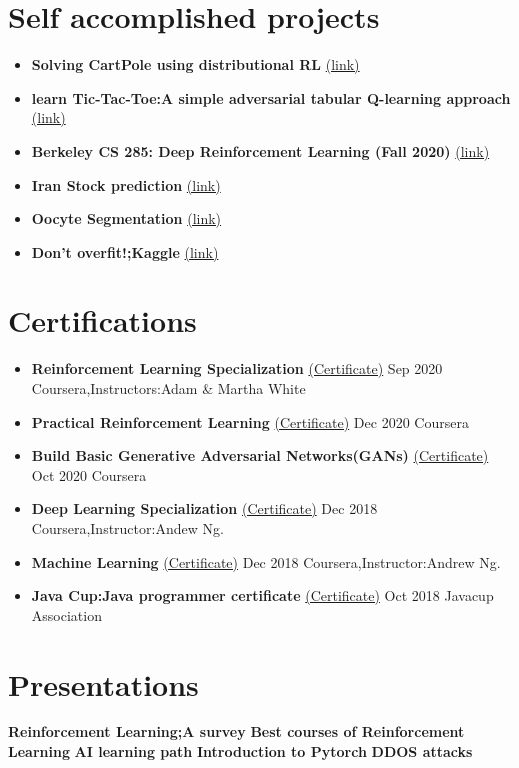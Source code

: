 \documentclass[paper=a4,fontsize=11pt]{scrartcl} %
\newcommand{\dline}{\newline \newline}
\newcommand{\NewPart}[1]{\section*{{#1}}}
\begin{document}
\NewPart{Self accomplished projects}
\begin{itemize}
    \item \textbf{Solving CartPole using distributional RL} \href{https://github.com/amirabbasii/Cartpole_C51}{(link)}
    \item \textbf{learn Tic-Tac-Toe:A simple adversarial tabular Q-learning approach} \href{https://github.com/amirabbasii/Tic-Tac-Toe_QLearning}{(link)}
    \item \textbf{Berkeley CS 285: Deep Reinforcement Learning (Fall 2020)}  \href{https://github.com/amirabbasii/Deep-RL-Berkeley}{(link)}
    \item \textbf{Iran Stock prediction} \href{https://github.com/amirabbasii/Iran_Stock_prediction}{(link)}
    \item \textbf{Oocyte Segmentation } \href{https://colab.research.google.com/drive/1zIRFSCfcLPRucaLF2GXegeOdCgjLZYTA?usp=sharing}{(link)}   
     \item \textbf{Don't overfit!;Kaggle} \href{https://colab.research.google.com/drive/1KByeRkWlJtuq1nUBYs_46Rt4cpdRRW2M?usp=sharing}{(link)}

\end{itemize}
\NewPart{Certifications}
\begin{itemize}

\item \small \textbf{Reinforcement Learning Specialization} \href{http://coursera.org/verify/specialization/S4WB3X7GUWS3}{(Certificate)} \hfill Sep 2020 \newline
\footnotesize Coursera,Instructors:Adam \& Martha White
\item \small \textbf{Practical Reinforcement Learning} \href{http://coursera.org/verify/XNZUDEGL2W76}{(Certificate)} \hfill Dec 2020 \newline
Coursera
\item \small \textbf{Build Basic Generative Adversarial Networks(GANs)} \href{http://coursera.org/verify/XH3W8DC5DYV6}{(Certificate)} \hfill Oct 2020 \newline
Coursera
\item \small \textbf{Deep Learning Specialization} \href{}{(Certificate)} \hfill Dec 2018 \newline
\footnotesize Coursera,Instructor:Andew Ng. 
\item \small \textbf{Machine Learning} \href{}{(Certificate)} \hfill Dec 2018 \newline
\footnotesize Coursera,Instructor:Andrew Ng. 
\item \small \textbf{Java Cup:Java programmer certificate} \href{https://drive.google.com/file/d/1YTwEyrwLsdsbC-Hfo7t-j1eJyuE6mVdi/view?usp=sharing}{(Certificate)} \hfill Oct 2018 \newline
Javacup Association
\end{itemize}
\NewPart{Presentations}
\textbf{Reinforcement Learning;A survey} \dline
\textbf{Best courses of Reinforcement Learning} \dline
\textbf{AI learning path} \dline
\textbf{Introduction to Pytorch} \dline
\textbf{DDOS attacks} \dline
\end{document}
